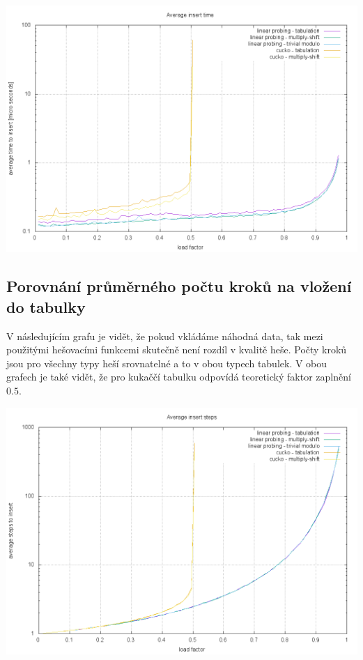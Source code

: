 \documentclass[12pt,a4paper]{report}
\begin{document}
\includegraphics[width=\textwidth]{./tests/time_test/uniform-test8.png}

\subsection*{Porovnání průměrného počtu kroků na vložení do tabulky}

V následujícím grafu je vidět, že pokud vkládáme náhodná data, tak mezi použitými hešovacími funkcemi 
skutečně není rozdíl v kvalitě heše. Počty kroků jsou pro všechny typy heší srovnatelné a to v obou
typech tabulek. V obou grafech je také vidět, že pro kukaččí tabulku odpovídá teoretický faktor zaplnění $0.5$.

\includegraphics[width=\textwidth]{./tests/steps_test/uniform-test.png}
\end{document}

